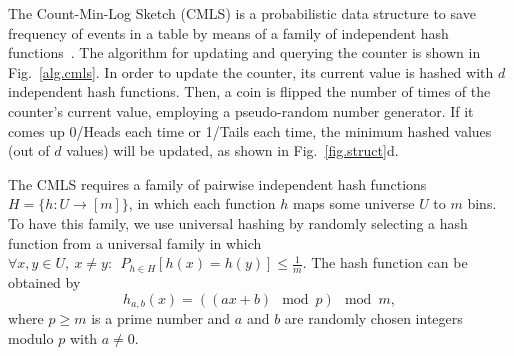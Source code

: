 The Count-Min-Log Sketch (CMLS) is a probabilistic data structure to save frequency of events in a table by means of a family of independent hash functions~\cite{pitel2015count}. The algorithm for updating and querying the counter is shown in Fig.~\ref{alg.cmls}. In order to update the counter, its current value is hashed with $d$ independent hash functions. Then, a coin is flipped the number of times of the counter's current value, employing a pseudo-random number generator. If it comes up 0/Heads each time or 1/Tails each time, the minimum hashed values (out of $d$ values) will be updated, as shown in Fig.~\ref{fig.struct}d.

The CMLS requires a family of pairwise independent hash functions
$H = \{h: U \to [m]\}$, in which each function $h$ maps some universe $U$ to $m$ bins.
To have this family, we use universal hashing by randomly selecting a hash function from a universal family in which $\forall x,y\in U,~x\neq y:~~P_{h\in H}[h(x)=h(y)]\leq \frac{1}{m}$.
The hash function can be obtained by
\begin{equation}
  h_{a,b}(x)=\left((ax+b)~\bmod p\right)~\bmod m,
\end{equation}
where $p\ge m$ is a prime number and $a$ and $b$ are randomly chosen integers modulo $p$ with $a\neq 0$.

